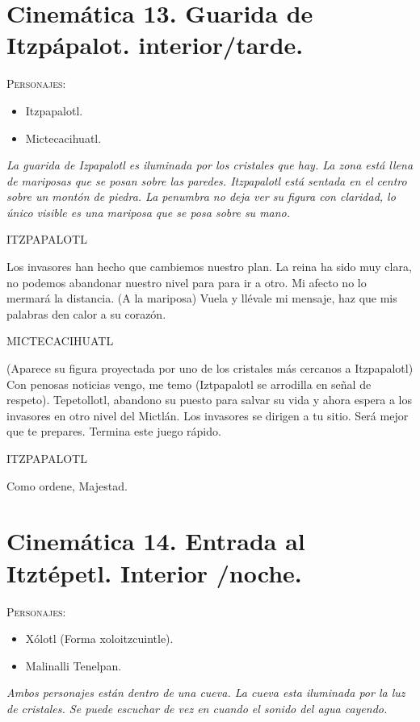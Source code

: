 \documentclass[11pt,letterpaper]{article}
\begin{document}
\section{Cinemática 13. Guarida de Itzpápalot. interior/tarde.}
 \textsc{Personajes}:
 \begin{itemize}
 \item Itzpapalotl.
 \item Mictecacihuatl.
 \end{itemize}
 \textit{La guarida de Izpapalotl es iluminada por los cristales que hay. La zona está llena de mariposas que se posan sobre las paredes. Itzpapalotl está sentada en el centro sobre un montón de piedra. La penumbra no deja ver su figura con claridad, lo único visible es una mariposa que se posa sobre su mano.}
 \begin{center}
 ITZPAPALOTL
 \\
\par
Los invasores han hecho que cambiemos nuestro plan. La reina ha sido muy clara, no podemos abandonar nuestro nivel para para ir a otro. Mi afecto no lo mermará la distancia. (A la mariposa) Vuela y llévale mi mensaje, haz que mis palabras den calor a su corazón.
\\
\par
MICTECACIHUATL
\\
\par
(Aparece su figura proyectada por uno de los cristales más cercanos a Itzpapalotl) Con penosas noticias vengo, me temo (Iztpapalotl se arrodilla en señal de respeto). Tepetollotl, abandono su puesto para salvar su vida y ahora espera a los invasores en otro nivel del Mictlán. Los invasores se dirigen a tu sitio. Será mejor que te prepares. Termina este juego rápido.
\\
\par
ITZPAPALOTL
\\
\par
Como ordene, Majestad. 
 \end{center}
 
\section{Cinemática 14. Entrada al Itztépetl. Interior /noche.}
 \textsc{Personajes}:
 \begin{itemize}
 \item Xólotl (Forma xoloitzcuintle).
 \item Malinalli Tenelpan.

 \end{itemize}
 \textit{Ambos personajes están dentro de una cueva.  La cueva esta iluminada por la luz de cristales. Se puede escuchar de vez en cuando el sonido del agua cayendo. }
\end{document}
